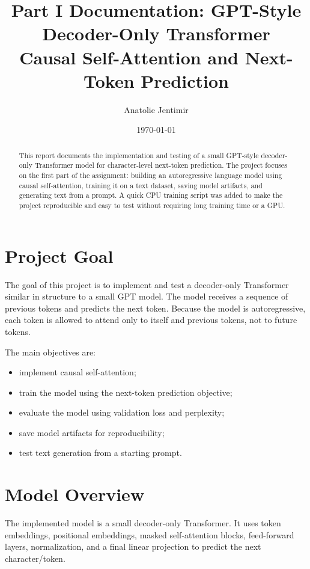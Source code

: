 \documentclass[11pt]{article}
\title{\textbf{Part I Documentation: GPT-Style Decoder-Only Transformer}\\
\large Causal Self-Attention and Next-Token Prediction}
\author{Anatolie Jentimir}
\date{\today}
\begin{document}
\maketitle

\begin{abstract}
This report documents the implementation and testing of a small GPT-style decoder-only Transformer model for character-level next-token prediction. The project focuses on the first part of the assignment: building an autoregressive language model using causal self-attention, training it on a text dataset, saving model artifacts, and generating text from a prompt. A quick CPU training script was added to make the project reproducible and easy to test without requiring long training time or a GPU.
\end{abstract}

\section{Project Goal}

The goal of this project is to implement and test a decoder-only Transformer similar in structure to a small GPT model. The model receives a sequence of previous tokens and predicts the next token. Because the model is autoregressive, each token is allowed to attend only to itself and previous tokens, not to future tokens.

The main objectives are:

\begin{itemize}[leftmargin=*]
    \item implement causal self-attention;
    \item train the model using the next-token prediction objective;
    \item evaluate the model using validation loss and perplexity;
    \item save model artifacts for reproducibility;
    \item test text generation from a starting prompt.
\end{itemize}

\section{Model Overview}

The implemented model is a small decoder-only Transformer. It uses token embeddings, positional embeddings, masked self-attention blocks, feed-forward layers, normalization, and a final linear projection to predict the next character/token.
\end{document}
